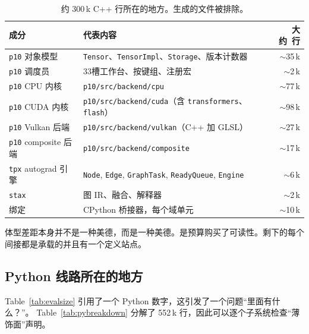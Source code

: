 \begin{table}[H]
\centering
\caption{约 300\,k C++ 行所在的地方。生成的文件被排除。}
\label{tab:corebreakdown}
\small
\begin{tabular}{llr}
\toprule
成分 & 代表内容 & 大约\ 行 \\
\midrule
\texttt{p10} 对象模型 & \texttt{Tensor}、\texttt{TensorImpl}、\texttt{Storage}、版本计数器 & $\sim$35\,k \\
\texttt{p10} 调度员 & 33槽工作台、按键组、注册宏 & $\sim$2\,k \\
\texttt{p10} CPU 内核 & \texttt{p10/src/backend/cpu} & $\sim$77\,k \\
\texttt{p10} CUDA 内核 & \texttt{p10/src/backend/cuda}（含 \texttt{transformers}、\texttt{flash}） & $\sim$98\,k \\
\texttt{p10} Vulkan 后端 & \texttt{p10/src/backend/vulkan}（C++ 加 GLSL） & $\sim$27\,k \\
\texttt{p10} composite 后端 & \texttt{p10/src/backend/composite} & $\sim$17\,k \\
\texttt{tpx} autograd 引擎 & \texttt{Node}, \texttt{Edge}, \texttt{GraphTask}, \texttt{ReadyQueue}, \texttt{Engine} & $\sim$6\,k \\
\texttt{stax} & 图 IR、融合、解释器 & $\sim$2\,k \\
绑定 & CPython 桥接器，每个域单元 & $\sim$10\,k \\
\bottomrule
\end{tabular}
\end{table}

体型差距本身并不是一种美德，而是一种美德。是预算购买了可读性。剩下的每个间接都是承载的并且有一个定义站点。

\subsection{Python 线路所在的地方}
\label{subsec:eval-pybreakdown}

Table~\ref{tab:evalsize} 引用了一个 Python 数字，这引发了一个问题“里面有什么？”。 Table~\ref{tab:pybreakdown} 分解了 552\,k 行，因此可以逐个子系统检查“薄饰面”声明。

